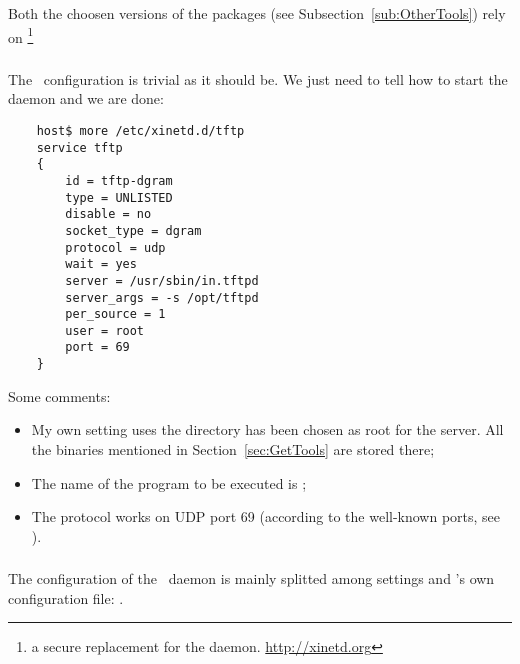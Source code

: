     Both the choosen versions of the packages (see
    Subsection~\ref{sub:OtherTools}) rely on \footnote{
        a secure replacement for the  daemon.
        \url{http://xinetd.org}
    }

    \subsubsection{\TFTPd}

        The \TFTPd\ configuration is trivial as it should be. We just need
        to tell  how to start the daemon and we are
        done:

\begin{lstlisting}
    host$ more /etc/xinetd.d/tftp
    service tftp
    {
        id = tftp-dgram
        type = UNLISTED
        disable = no
        socket_type = dgram
        protocol = udp
        wait = yes
        server = /usr/sbin/in.tftpd
        server_args = -s /opt/tftpd
        per_source = 1
        user = root
        port = 69
    }
\end{lstlisting}

        Some comments:
        \begin{itemize}
        \item   My own setting uses the directory 
                has been chosen as root for the server. All the binaries
                mentioned in Section~\ref{sec:GetTools} are stored there;
        \item   The name of the program to be executed is
                ;
        \item   The protocol works on UDP port 69 (according to the
                well-known ports, see ).
        \end{itemize}

    \subsubsection{ \BootPd } \label{subsub:BootPd}

        The configuration of the \BootPd\ daemon is mainly splitted among
         settings and \BootPd's own configuration file:
        .

